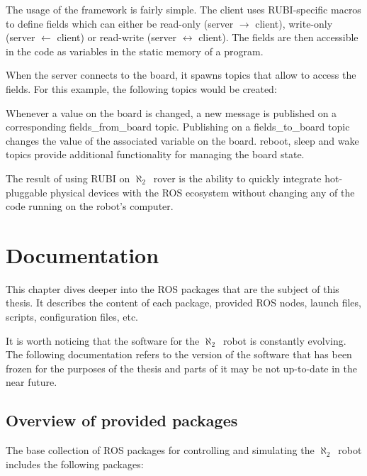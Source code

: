 \documentclass[english,inz,shortabstract]{iithesis}
\newcommand{\rovername}{$\aleph_2$\ }
\begin{document}
	The usage of the framework is fairly simple. The client uses RUBI-specific macros to define fields which can either be read-only (server $\rightarrow$ client), write-only (server $\leftarrow$ client) or read-write (server $\leftrightarrow$ client). The fields are then accessible in the code as variables in the static memory of a program.

	

	When the server connects to the board, it spawns topics that allow to access the fields. For this example, the following topics would be created:

	

	Whenever a value on the board is changed, a new message is published on a corresponding \textsf{fields\_from\_board} topic. Publishing on a \textsf{fields\_to\_board} topic changes the value of the associated variable on the board. \textsf{reboot}, \textsf{sleep} and \textsf{wake} topics provide additional functionality for managing the board state.

	The result of using RUBI on \rovername rover is the ability to quickly integrate hot-pluggable physical devices with the ROS ecosystem without changing any of the code running on the robot's computer.


\chapter{Documentation}

This chapter dives deeper into the ROS packages that are the subject of this thesis. It describes the content of each package, provided ROS nodes, launch files, scripts, configuration files, etc.

It is worth noticing that the software for the \rovername robot is constantly evolving. The following documentation refers to the version of the software that has been frozen for the purposes of the thesis and parts of it may be not up-to-date in the near future.

\section{Overview of provided packages} \label{overview}

	The base collection of ROS packages for controlling and simulating the \rovername robot includes the following packages:
\end{document}
